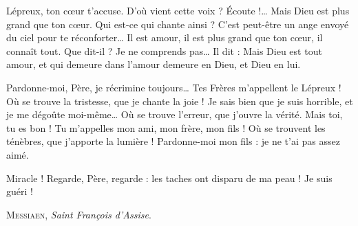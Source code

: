 \documentclass[a5paper,12pt]{article}
\begin{document}

\begin{dialogue}
   Lépreux, ton cœur t'accuse.
   D'où vient cette voix ?
   Écoute !…
   Mais Dieu est plus grand que ton cœur.
   Qui est-ce qui chante ainsi ?
   C'est peut-être un ange envoyé du ciel pour te réconforter…
   Il est amour, il est plus grand que ton cœur, il connaît tout.
   Que dit-il ? Je ne comprends pas…
   Il dit : 
   Mais Dieu est tout amour, et qui demeure dans l'amour demeure en Dieu, et Dieu en lui.
\end{dialogue}


\begin{dialogue}
   Pardonne-moi, Père, je récrimine toujours… Tes Frères m'appellent le Lépreux !
   Où se trouve la tristesse, que je chante la joie !
   Je sais bien que je suis horrible, et je me dégoûte moi-même…
   Où se trouve l'erreur, que j'ouvre la vérité.
   Mais toi, tu es bon ! Tu m'appelles mon ami, mon frère, mon fils !
   Où se trouvent les ténèbres, que j'apporte la lumière ! Pardonne-moi mon fils : je ne t'ai pas assez aimé.
\end{dialogue}


\begin{dialogue}
   Miracle ! Regarde, Père, regarde : les taches ont disparu de ma peau ! Je suis guéri !
\end{dialogue}

\begin{flushright}
\large
\textsc{Messiaen}, \textit{Saint François d'Assise}.
\end{flushright}
\end{document}
